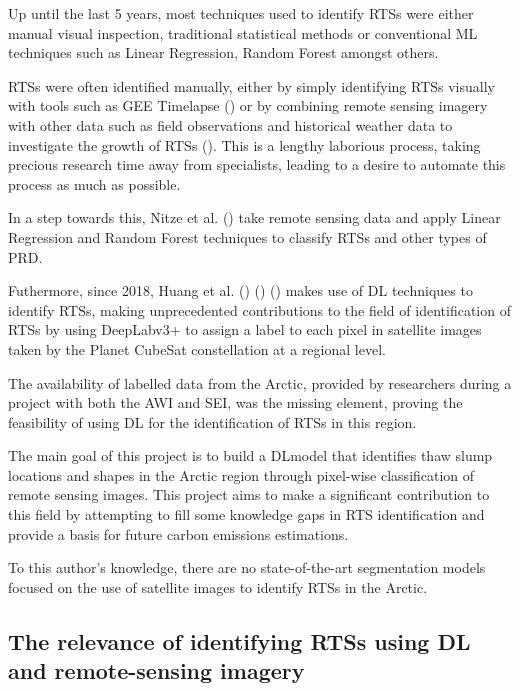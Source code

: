 Up until the last 5 years, most techniques used to identify \gls{RTS}s were either manual visual inspection, traditional statistical methods or conventional \gls{ML} techniques such as Linear Regression, Random Forest amongst others.

\gls{RTS}s were often identified manually, either by simply identifying \gls{RTS}s visually with tools such as \gls{GEE} Timelapse (\cite{lewkowicz_extremes_2019}) or by combining remote sensing imagery with other data such as field observations and historical weather data to investigate the growth of \gls{RTS}s (\cite{KOKELJ201556}). This is a lengthy laborious process, taking precious research time away from specialists, leading to a desire to automate this process as much as possible.

In a step towards this, Nitze et al. (\cite{articleing2018}) take remote sensing data and apply Linear Regression and Random Forest techniques to classify \gls{RTS}s and other types of \gls{PRD}.

Futhermore, since 2018, Huang et al. (\cite{HUANG10122067}) (\cite{HUANG2020111534}) (\cite{HUANG2021102399}) makes use of \gls{DL} techniques to identify \gls{RTS}s, making unprecedented contributions to the field of identification of \gls{RTS}s by using DeepLabv3+ to assign a label to each pixel in satellite images taken by the Planet CubeSat constellation at a regional level.

The availability of labelled data from the Arctic, provided by researchers during a project with both the \gls{AWI} and \gls{SEI}, was the missing element, proving the feasibility of using DL for the identification of \gls{RTS}s in this region.

The main goal of this project is to build a \gls{DL}model that identifies thaw slump locations and shapes in the Arctic region through pixel-wise classification of remote sensing images. This project aims to make a significant contribution to this field by attempting to fill some knowledge gaps in \gls{RTS} identification and provide a basis for future carbon emissions estimations.

To this author's knowledge, there are no state-of-the-art segmentation models focused on the use of satellite images to identify \gls{RTS}s in the Arctic.

\subsection{The relevance of identifying \gls{RTS}s using \gls{DL} and remote-sensing imagery} \label{rts_ref}
